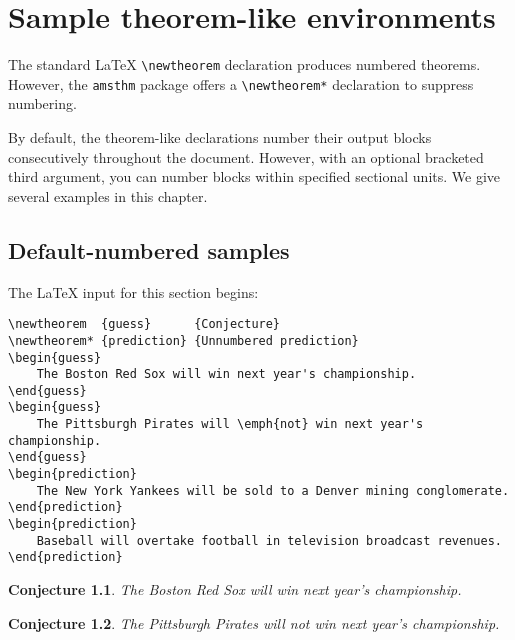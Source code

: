 
\chapter{Sample theorem-like environments}

The standard \LaTeX{} \verb=\newtheorem= declaration produces numbered
theorems.  However, the \verb=amsthm= package offers a
\verb=\newtheorem*= declaration to suppress numbering.

By default, the theorem-like declarations number their output blocks
consecutively throughout the document.  However, with an optional
bracketed third argument, you can number blocks within specified
sectional units.  We give several examples in this chapter.


\section{Default-numbered samples}

The \LaTeX{} input for this section begins:
%
\begin{verbatim}
\newtheorem  {guess}      {Conjecture}
\newtheorem* {prediction} {Unnumbered prediction}
\begin{guess}
    The Boston Red Sox will win next year's championship.
\end{guess}
\begin{guess}
    The Pittsburgh Pirates will \emph{not} win next year's championship.
\end{guess}
\begin{prediction}
    The New York Yankees will be sold to a Denver mining conglomerate.
\end{prediction}
\begin{prediction}
    Baseball will overtake football in television broadcast revenues.
\end{prediction}
\end{verbatim}

%
\newtheorem  {guess}      {Conjecture}

\newtheorem* {prediction} {Unnumbered prediction}

\begin{guess}
    The Boston Red Sox will win next year's championship.
\end{guess}

\begin{guess}
    The Pittsburgh Pirates will \emph{not} win next year's championship.
\end{guess}

